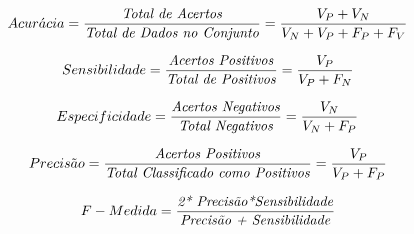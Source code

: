 \begin{equation}
Acur\acute{a}cia =\frac{\textrm{\textit{Total de Acertos}}}{\textrm{\textit{Total de Dados no Conjunto}}} \\
=\frac{V_P + V_N}{V_N+V_P+F_P+F_V}
\label{eq:Acuracia}
\end{equation}

\begin{equation}
Sensibilidade =\frac{\textrm{\textit{Acertos Positivos}}}{\textrm{\textit{Total de Positivos}}} \\
=\frac{V_P}{V_P+F_N}
\label{eq:Sensibilidade}
\end{equation}

\begin{equation}
Especificidade =\frac{\textrm{\textit{Acertos Negativos}}}{\textrm{\textit{Total Negativos}}} \\
=\frac{V_N}{V_N+F_P}
\label{eq:Especificidade}
\end{equation}

\begin{equation}
Precis\tilde{a}o =\frac{\textrm{\textit{Acertos Positivos}}}{\textrm{\textit{Total Classificado como Positivos}}} \\
=\frac{V_P}{V_P+F_P}
\label{eq:Precisao}
\end{equation} 

\begin{equation}
F-Medida =\frac{\textrm{\textit{2* Precisão*Sensibilidade}}}{\textrm{\textit{Precisão + Sensibilidade}}} 
\label{eq:FMedida}
\end{equation} 
 
      
   





   
